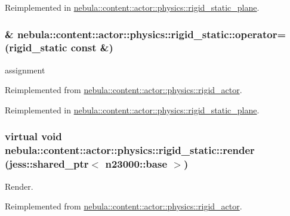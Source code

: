 Reimplemented in \hyperlink{classnebula_1_1content_1_1actor_1_1physics_1_1rigid__static__plane_ae7e418de928a5830a9e088bb843c95f0}{nebula::content::actor::physics::rigid\_\-static\_\-plane}.\hypertarget{classnebula_1_1content_1_1actor_1_1physics_1_1rigid__static_ae32ba52ca54bc1cc78572b931a98600d}{
\subsubsection[{operator=}]{\& nebula::content::actor::physics::rigid\_\-static::operator= ({\bf rigid\_\-static} const \&)}}
\label{classnebula_1_1content_1_1actor_1_1physics_1_1rigid__static_ae32ba52ca54bc1cc78572b931a98600d}


assignment 

Reimplemented from \hyperlink{classnebula_1_1content_1_1actor_1_1physics_1_1rigid__actor_aa3d6e979793753e37b9b95b118e40c67}{nebula::content::actor::physics::rigid\_\-actor}.

Reimplemented in \hyperlink{classnebula_1_1content_1_1actor_1_1physics_1_1rigid__static__plane_a507d6d75754916f23d673205d53b3874}{nebula::content::actor::physics::rigid\_\-static\_\-plane}.\hypertarget{classnebula_1_1content_1_1actor_1_1physics_1_1rigid__static_aa845026fbca4fa5967ac9d8ffcb2e10a}{
\subsubsection[{render}]{\setlength{\rightskip}{0pt plus 5cm}virtual void nebula::content::actor::physics::rigid\_\-static::render (jess::shared\_\-ptr$<$ {\bf n23000::base} $>$)}}
\label{classnebula_1_1content_1_1actor_1_1physics_1_1rigid__static_aa845026fbca4fa5967ac9d8ffcb2e10a}


Render. 

Reimplemented from \hyperlink{classnebula_1_1content_1_1actor_1_1physics_1_1rigid__actor_af9f27bb90193c5a85a3572ef15009bf7}{nebula::content::actor::physics::rigid\_\-actor}.

